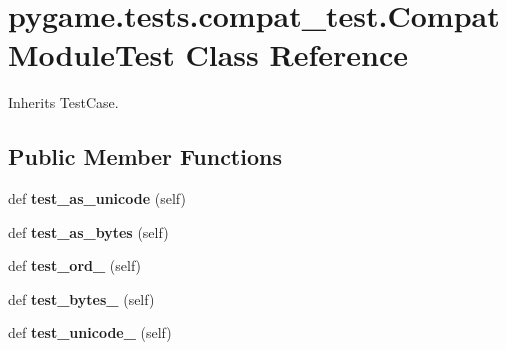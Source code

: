 \hypertarget{classpygame_1_1tests_1_1compat__test_1_1_compat_module_test}{}\section{pygame.\+tests.\+compat\+\_\+test.\+Compat\+Module\+Test Class Reference}
\label{classpygame_1_1tests_1_1compat__test_1_1_compat_module_test}


Inherits Test\+Case.

\subsection*{Public Member Functions}
\begin{DoxyCompactItemize}
\item 
\mbox{\label{classpygame_1_1tests_1_1compat__test_1_1_compat_module_test_a6087a25d98214d85c5dd65ad1ba230ef}} 
def {\bfseries test\+\_\+as\+\_\+unicode} (self)
\item 
\mbox{\label{classpygame_1_1tests_1_1compat__test_1_1_compat_module_test_a371385510a271d8b1b876597dc933eb7}} 
def {\bfseries test\+\_\+as\+\_\+bytes} (self)
\item 
\mbox{\label{classpygame_1_1tests_1_1compat__test_1_1_compat_module_test_ac2008e13ad5cdcf4fda9b29b3f85fa01}} 
def {\bfseries test\+\_\+ord\+\_\+} (self)
\item 
\mbox{\label{classpygame_1_1tests_1_1compat__test_1_1_compat_module_test_adfba39720ccfe469b31eef5039ae9649}} 
def {\bfseries test\+\_\+bytes\+\_\+} (self)
\item 
\mbox{\label{classpygame_1_1tests_1_1compat__test_1_1_compat_module_test_a629438401190a5735092628ce0a20576}} 
def {\bfseries test\+\_\+unicode\+\_\+} (self)
\item 
\mbox{\label{classpygame_1_1tests_1_1compat__test_1_1_compat_module_test_a308afbfc2facbacb1cdd75872d7b4bac}} 

\end{DoxyCompactItemize}
